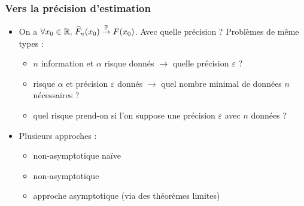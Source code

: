 \begin{frame}
\frametitle{Vers la précision d'estimation}
\begin{itemize}
\item On a $\forall x_0 \in \operatorname{{\mathbb R}},\,\widehat F_n(x_0)\stackrel{\operatorname{{\mathbb P}}}{\rightarrow} F(x_0)$. Avec \alert{quelle précision ?}
\alert{Problèmes de même types} :
\begin{itemize}
\item $n$ \alert{information} et $\alpha$ \alert{risque} donnés $\rightarrow$ quelle  \alert{précision} $\varepsilon$ ?
\item risque $\alpha$ et précision $\varepsilon$ donnés $\rightarrow$ quel nombre minimal de données $n$ nécessaires ?
\item quel risque prend-on si l'on suppose une précision $\varepsilon$ avec $n$ données ?
\end{itemize}

\item Plusieurs approches :
\begin{itemize}
\item non-asymptotique naïve
\item non-asymptotique
\item \alert{approche asymptotique (via des théorèmes limites)}
\end{itemize}
\end{itemize}
\end{frame}

